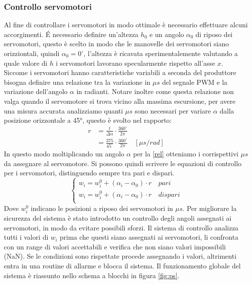 \documentclass[11pt]{article}
\begin{document}
\subsubsection{Controllo servomotori}
Al fine di controllare i servomotori in modo ottimale è necessario effettuare alcuni accorgimenti.
É necessario definire un'altezza $h_0$ e un angolo $\alpha_0$ di riposo dei servomotori, questo è scelto in modo che le manovelle dei servomotori siano orizziontali, quindi $\alpha_0=0^\circ$, l'altezza è ricavata sperimentalemente valutando a quale valore di $h$ i servomotori lavorano specularmente rispetto all'asse $x$.
Siccome i servomotori hanno caratteristiche variabili a seconda del produttore bisogna definire una relazione tra la variazione in $\mu s$ del segnale PWM e la variazione dell'angolo $\alpha$ in radianti. Notare inoltre come questa relazione non valga quando il servomotore si trova vicino alla massima escursione, per avere una misura accurata analizziamo quanti $\mu s$ sono necessari per variare $\alpha$ dalla posizione orizzontale a 45°, questo è svolto nel rapporto:
\begin{align}\label{rel}
r &=\frac{t}{\Delta\alpha}\cdot \frac{360^\circ}{2 \pi}\\
	&= \frac{375}{45^\circ}\cdot \frac{360^\circ}{2 \pi} \quad [\mu s/rad]
\end{align}
In questo modo moltiplicando un angolo $\alpha$ per la \eqref{rel} otteniamo i corrispettivi $\mu s$ da assegnare al servomotore. Si possono quindi scrivere le equazioni di controllo per i servomotori, distinguendo sempre tra pari e dispari.
\begin{equation}\label{w}
    \begin{cases}
      w_i=w_i^0 +(\alpha_i-\alpha_0)\cdot r	\quad pari \\
      w_i=w_i^0 +(\alpha_i-\alpha_0)\cdot r	\quad dispari \\
    \end{cases}
\end{equation}
Dove $w_i^0$ indicano le posizioni a riposo dei servomotori in $\mu s$.
Per migliorare la sicurezza del sistema è stato introdotto un controllo degli angoli assegnati ai servomotori, in modo da evitare possibili sforzi.
Il sistema di controllo analizza tutti i valori di $w_i$ prima che questi siano assegnati ai servomotori, li confronta con un range di valori accettabili e verifica che non siano valori impossibili (NaN).
Se le condizioni sono rispettate procede assegnando i valori, altrimenti entra in una routine di allarme e blocca il sistema. Il funzionamento globale del sistema è riassunto nello schema a blocchi in figura \ref{fig:ps}.
\end{document}
